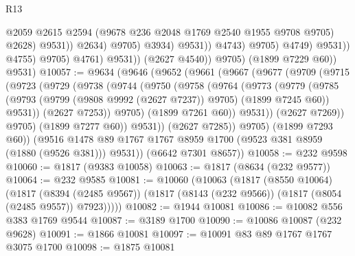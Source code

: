 \begin{lexlean}{R13}
\begin{coremodule}
                                                @2059
                                                @2615
                                                @2594
                                                (@9678 @236 @2048 @1769 @2540 @1955 @9708 @9705)
                                                @2628)
                                              @9531))
                                          @2634)
                                        @9705)
                                      @3934)
                                    @9531))
                                @4743)
                              @9705)
                            @4749)
                          @9531))
                      @4755)
                    @9705)
                  @4761)
                @9531))
            (@2627 @4540))
          @9705)
        (@1899 @7229 @60))
      @9531)
@10057 := @9634
    (@9646
      (@9652
        (@9661
          (@9667
            (@9677
              (@9709
                (@9715
                  (@9723
                    (@9729
                      (@9738
                        (@9744
                          (@9750
                            (@9758
                              (@9764
                                (@9773
                                  (@9779
                                    (@9785
                                      (@9793
                                        (@9799 (@9808 @9992 (@2627 @7237)) @9705)
                                        (@1899 @7245 @60))
                                      @9531))
                                  (@2627 @7253))
                                @9705)
                              (@1899 @7261 @60))
                            @9531))
                        (@2627 @7269))
                      @9705)
                    (@1899 @7277 @60))
                  @9531))
              (@2627 @7285))
            @9705)
          (@1899 @7293 @60))
        (@9516 @1478 @89 @1767 @1767 @8959 @1700 (@9523 @381 @8959 (@1880 (@9526 @381))) @9531))
      (@6642 @7301 @8657))
@10058 := @232 @9598
@10060 := @1817 (@9383 @10058)
@10063 := @1817 (@8634 (@232 @9577))
@10064 := @232 @9585
@10081 := @10060
    (@10063
      (@1817
        (@8550 @10064)
        (@1817
          (@8394 (@2485 @9567))
          (@1817 (@8143 (@232 @9566)) (@1817 (@8054 (@2485 @9557)) @7923)))))
@10082 := @1944 @10081
@10086 := @10082 @556 @383 @1769 @9544
@10087 := @3189 @1700
@10090 := @10086 @10087 (@232 @9628)
@10091 := @1866 @10081
@10097 := @10091 @83 @89 @1767 @1767 @3075 @1700
@10098 := @1875 @10081

\end{coremodule}
\end{lexlean}
